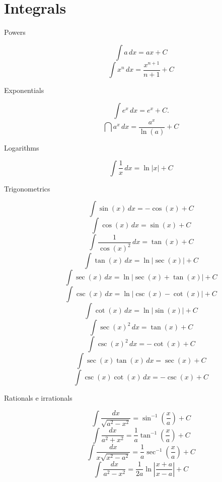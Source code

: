 \section*{Integrals}
\small
{}

\begin{multicols}{2}
\begin{tcolorbox}[hbox, title=Basic antiderivatives]
\begin{minipage}{0.4\textwidth}
\begin{description}
  \item[Powers]
  \[
    \int a\,dx=ax+C
  \]
  \[
    \int x^n\,dx=\dfrac{x^{n+1}}{n+1}+C
  \]
  \item[Exponentials]
  \[
    \int e^x\,dx=e^x+C.
  \]
  \[
    \dint a^x\,dx=\dfrac{a^x}{\ln(a)}+C
  \]
  \item[Logarithms]
  \[
    \int \dfrac{1}{x}\, dx=\ln|x|+C
  \]
  \item[Trigonometrics]
  \[
    \int \sin(x)\, dx=-\cos(x)+C
  \]
  \[
    \int \cos(x)\, dx=\sin(x)+C
  \]
  \[
    \int \frac{1}{\cos(x)^2}\, dx = \tan(x)+C
  \]
  \[
    \int \tan(x)\, dx=\ln|\sec(x)|+C
  \]
  \[
    \int \sec(x)\, dx = \ln|\sec(x) + \tan(x)|+C
  \]
  \[
    \int \csc(x)\, dx= \ln|\csc(x)-\cot(x)|+C
  \] 
  \[
    \int \cot(x) \, dx= \ln|\sin(x)|+C
  \] 
  \[
    \int \sec(x)^2\, dx= \tan(x)+ C
  \] 
  \[
    \int \csc(x)^2\, dx= -\cot(x)+ C
  \] 
  \[
    \int \sec(x)\tan(x)\, dx= \sec(x)+ C
  \] 
  \[
    \int \csc(x)\cot(x)\, dx = -\csc(x) +C
  \]
  \item[Rationals e irrationals]
  \[
    \int\frac{dx}{\sqrt{a^2-x^2}}=\sin^{-1}\left(\frac{x}{a}\right)+C
  \] 
  \[
    \int\frac{dx}{a^2+x^2}=\frac{1}{a}\tan^{-1}\left(\dfrac{x}{a}\right)+C
  \] 
  \[
    \int\dfrac{dx}{x\sqrt{x^2-a^2}}=\frac{1}{a}\sec^{-1}\left(\dfrac{x}{a}\right)+C
  \] 
  \[
    \int\frac{dx}{a^2-x^2}=\frac{1}{2a}\ln\left|\frac{x+a}{x-a}\right|+C
  \]
\end{description}
\end{minipage}
\end{tcolorbox}


\end{multicols}
